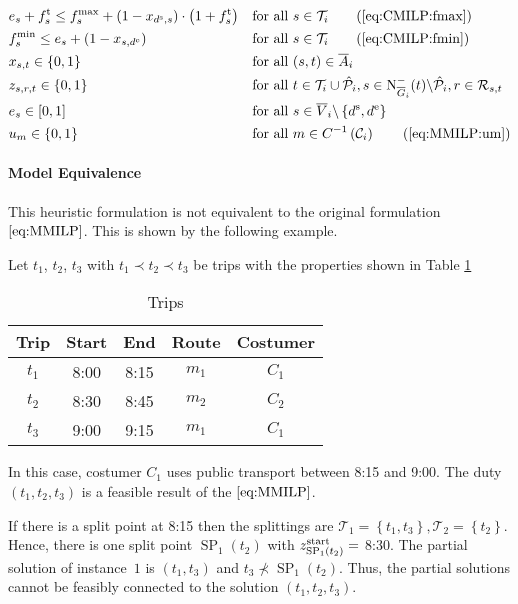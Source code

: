 \begin{align}
	& e_s + \ft_s \leq f^{\max}_s + \left(1-x_{\ds,s}\right)\cdot\left(1+\ft_s\right) && \text{for all } s\in\Ti \tag{\ref{eq:CMILP:fmax}} \\
	& f^{\min}_s \leq e_s + \left(1-x_{s,\de}\right) && \text{for all } s\in\Ti \tag{\ref{eq:CMILP:fmin}} \\
	& x_{s,t}\in\{0,1\} & & \text{for all } (s,t)\in\overline{A}_i \label{eq:CMILP:xst} \\
	& z_{s,r,t}\in\{0,1\} & & \text{for all } t\in\Ti\cup\Phat_i,s\in\Ninoi(t)\backslash\Phat_i,r\in\Rst \label{eq:CMILP:zsrt} \\
	& e_s\in[0,1] & & \text{for all } s\in\overline{V}_i\backslash\left\{\ds,\de\right\} \label{eq:CMILP:es} \\
	& u_m\in\{0,1\} && \text{for all } m\in C^{-1}\left(\mathcal{C}_i\right) \tag{\ref{eq:MMILP:um}}
\end{align}

\paragraph{Model Equivalence} \parfill

This heuristic formulation is not equivalent to the original formulation $\eqref{eq:MMILP}$. This is shown by the following example.

\begin{example}

Let $t_1$, $t_2$, $t_3$ with $t_1\prec t_2\prec t_3$ be trips with the properties shown in Table \ref{tab:costumer_heuristic_example}

\begin{table}[hb]
	\centering
	\begin{tabular}{c|cccc}
		Trip & Start & End & Route & Costumer \\
		\hline
		$t_1$ & 8:00 & 8:15 & $m_1$ & $C_1$ \\
		$t_2$ & 8:30 & 8:45 & $m_2$ & $C_2$ \\
		$t_3$ & 9:00 & 9:15 & $m_1$ & $C_1$ \\
	\end{tabular}
	\caption{Trips}
	\label{tab:costumer_heuristic_example}
\end{table}

In this case, costumer $C_1$ uses public transport between 8:15 and 9:00. The duty $\left(t_1,t_2,t_3\right)$ is a feasible result of the $\eqref{eq:MMILP}$.

If there is a split point at 8:15 then the splittings are $\mathcal{T}_1=\left\{t_1,t_3\right\},\mathcal{T}_2=\left\{t_2\right\}$. Hence, there is one split point $\operatorname{SP}_1\left(t_2\right)$ with $z^{\operatorname{start}}_{\operatorname{SP}_1\left(t_2\right)} =$ 8:30. The partial solution of instance~$1$ is $\left(t_1,t_3\right)$ and $t_3\not\prec \operatorname{SP}_1\left(t_2\right)$. Thus, the partial solutions cannot be feasibly connected to the solution $\left(t_1,t_2,t_3\right)$.

\end{example}

